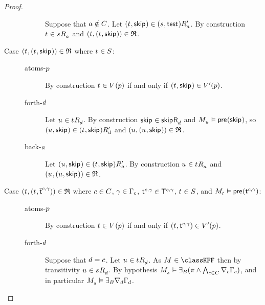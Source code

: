 \begin{proof}
\begin{description}
\begin{description}
                Suppose that $\agentA \notin \agentsC$.
                Let $(\kStateT, \aStateSkip) \in \kSuccessorsPA{(\kStateS, \aStateTest)}$.
                By construction $\kStateT \in \kSuccessorsA{\kStateS}$ and $(\kStateT, (\kStateT, \aStateSkip)) \in \refinement$.
        \end{description}
    \item[{Case $(\kStateT, (\kStateT, \aStateSkip)) \in \refinement$ where $\kStateT \in \kStates$:}] \hfill
        \begin{description}
            \item[atoms-$\atomP$]
                By construction $\kStateT \in \kValuation(\atomP)$ if and only if $(\kStateT, \aStateSkip) \in \kValuationP(\atomP)$.
            \item[forth-$\agentD$]
                Let $\kStateU \in \kSuccessorsD{\kStateT}$.
                By construction $\aStateSkip \in \aSuccessorsD{\aStateSkip}$ and $\kPModel{\kStateU} \entails \aPrecondition(\aStateSkip)$, so $(\kStateU, \aStateSkip) \in \kSuccessorsPD{(\kStateT, \aStateSkip)}$ and $(\kStateU, (\kStateU, \aStateSkip)) \in \refinement$.
            \item[back-$\agentA$]
                Let $(\kStateU, \aStateSkip) \in \kSuccessorsPA{(\kStateT, \aStateSkip)}$.
                By construction $\kStateU \in \kSuccessorsA{\kStateT}$ and $(\kStateU, (\kStateU, \aStateSkip)) \in \refinement$.
        \end{description}
    \item[{Case $(\kStateT, (\kStateT, \aPStateT[\agentC, \gamma])) \in \refinement$ where $\agentC \in \agentsC$, $\gamma \in \Gamma_\agentC$, $\aStateT[\agentC, \gamma] \in \aStatesT[\agentC, \gamma]$, $\kStateT \in \kStates$, and $\kPModel{\kStateT} \entails \aPrecondition(\aStateT[\agentC, \gamma])$:}] \hfill
        \begin{description}
            \item[atoms-$\atomP$]
                By construction $\kStateT \in \kValuation(\atomP)$ if and only if $(\kStateT, \aStateT[\agentC, \gamma]) \in \kValuationP(\atomP)$.
            \item[forth-$\agentD$]
                Suppose that $\agentD = \agentC$.
                Let $\kStateU \in \kSuccessorsD{\kStateT}$.
                As $\kModel \in \classKFF$ then by transitivity $\kStateU \in \kSuccessorsD{\kStateS}$.
                By hypothesis $\kPModel{\kStateS} \entails \someactsBs (\pi \land \bigwedge_{\agentC \in \agentsC} \coversC \Gamma_\agentC)$, and in particular $\kPModel{\kStateS} \entails \someactsBs \coversD \Gamma_\agentD$.

\end{description}
\end{description}
\end{proof}
